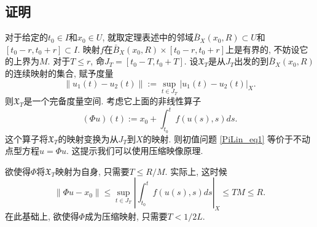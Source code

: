 \subsection{证明}
对于给定的$t_0\in I$和$x_0\in U$, 就取定理表述中的邻域$\bar B_X(x_0,R)\subset U$和$[t_0-r,t_0+r]\subset I$. 映射$f$在$\bar B_X(x_0,R)\times[t_0-r,t_0+r]$上是有界的, 不妨设它的上界为$M$. 对于$T\leq r$, 命$J_T=[t_0-T,t_0+T]$. 设$\mathfrak{X}_T$是从$J_T$出发的到$\bar B_X(x_0,R)$的连续映射的集合, 赋予度量
$$
\|u_1(t)-u_2(t)\|:=\sup_{t\in J_T}|u_1(t)-u_2(t)|_X.
$$
则$\mathfrak{X}_T$是一个完备度量空间. 考虑它上面的非线性算子
$$
(\Phi u)(t):=x_0+\int_{t_0}^tf(u(s),s)ds.
$$ 
这个算子将$\mathfrak{X}_T$的映射变换为从$J_T$到$X$的映射. 则初值问题 \autoref{PiLin_eq1} 等价于不动点型方程$u=\Phi u$. 这提示我们可以使用压缩映像原理.

欲使得$\Phi$将$\mathfrak{X}_T$映射为自身, 只需要$T\leq R/M$. 实际上, 这时候
$$
\|\Phi u-x_0\|
\leq\sup_{t\in J_T}\left|\int_{t_0}^tf(u(s),s)ds\right|_X
\leq TM\leq R.
$$
在此基础上, 欲使得$\Phi$成为压缩映射, 只需要$T<1/2L$. 